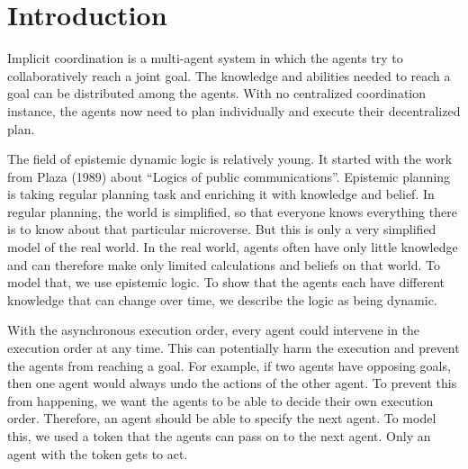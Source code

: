 \chapter{Introduction}\label{chap:introduction}





Implicit coordination is a multi-agent system in which the agents try to collaboratively reach a joint goal. The knowledge and abilities needed to reach a goal can be distributed among the agents. With no centralized coordination instance, the agents now need to plan individually and execute their decentralized plan.


The field of epistemic dynamic logic is relatively young. It started with the work from Plaza (1989) \cite{plaza1989logics} about ``Logics of public communications''.
Epistemic planning is taking regular planning task and enriching it with knowledge and belief. In regular planning, the world is simplified, so that everyone knows everything there is to know about that particular microverse. But this is only a very simplified model of the real world. In the real world, agents often have only little knowledge and can therefore make only limited calculations and beliefs on that world. To model that, we use epistemic logic. To show that the agents each have different knowledge that can change over time, we describe the logic as being dynamic.

With the asynchronous execution order, every agent could intervene in the execution order at any time. This can potentially harm the execution and prevent the agents from reaching a goal. For example, if two agents have opposing goals, then one agent would always undo the actions of the other agent.
To prevent this from happening, we want the agents to be able to decide their own execution order. Therefore, an agent should be able to specify the next agent. To model this, we used a token that the agents can pass on to the next agent. Only an agent with the token gets to act.


